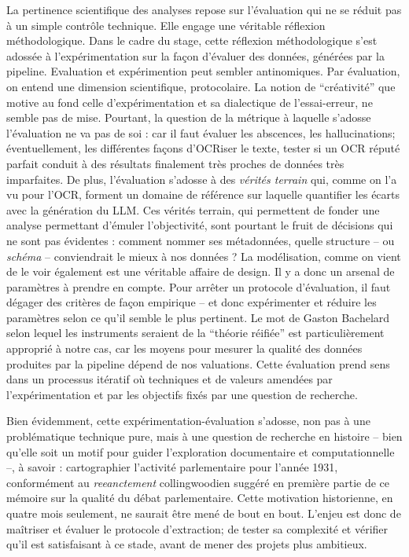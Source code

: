 La pertinence scientifique des analyses repose sur l'évaluation qui ne se réduit pas à un simple contrôle technique. Elle engage une véritable réflexion méthodologique. Dans le cadre du stage, cette réflexion méthodologique s'est adossée à l’expérimentation sur la façon d'évaluer des données, générées par la pipeline. Evaluation et expérimention peut sembler antinomiques. Par évaluation, on entend une dimension scientifique, protocolaire. La notion de \enquote{créativité} que motive au fond celle d'expérimentation et sa dialectique de l'essai-erreur, ne semble pas de mise. Pourtant, la question de la métrique à laquelle s'adosse l'évaluation ne va pas de soi : car il faut évaluer les abscences, les hallucinations; éventuellement, les différentes façons d'OCRiser le texte, tester si un OCR réputé parfait conduit à des résultats finalement très proches de données très imparfaites. De plus, l'évaluation s'adosse à des \emph{vérités terrain} qui, comme on l'a vu pour l'OCR, forment un domaine de référence sur laquelle quantifier les écarts avec la génération du LLM. Ces vérités terrain, qui permettent de fonder une analyse permettant d'émuler l'objectivité, sont pourtant le fruit de décisions qui ne sont pas évidentes : comment nommer ses métadonnées, quelle structure -- ou \emph{schéma} -- conviendrait le mieux à nos données ? La modélisation, comme on vient de le voir également est une véritable affaire de design. Il y a donc un arsenal de paramètres à prendre en compte. Pour arrêter un protocole d'évaluation, il faut dégager des critères de façon empirique -- et donc expérimenter et réduire les paramètres selon ce qu'il semble le plus pertinent. Le mot de Gaston Bachelard selon lequel les instruments seraient de la \enquote{théorie réifiée} est particulièrement approprié à notre cas, car les moyens pour mesurer la qualité des données produites par la pipeline dépend de nos valuations. Cette évaluation prend sens dans un processus itératif où techniques et de valeurs amendées par l'expérimentation et par les objectifs fixés par une question de recherche.

Bien évidemment, cette expérimentation-évaluation s'adosse, non pas à une problématique technique pure, mais à une question de recherche en histoire -- bien qu'elle soit un motif pour guider l'exploration documentaire et computationnelle --, à savoir : cartographier l'activité parlementaire pour l'année 1931, conformément au \emph{reeanctement} collingwoodien suggéré en première partie de ce mémoire sur la qualité du débat parlementaire. Cette motivation historienne, en quatre mois seulement, ne saurait être mené de bout en bout. L'enjeu est donc de maîtriser et évaluer le protocole d'extraction; de tester sa complexité et vérifier qu'il est satisfaisant à ce stade, avant de mener des projets plus ambitieux.

